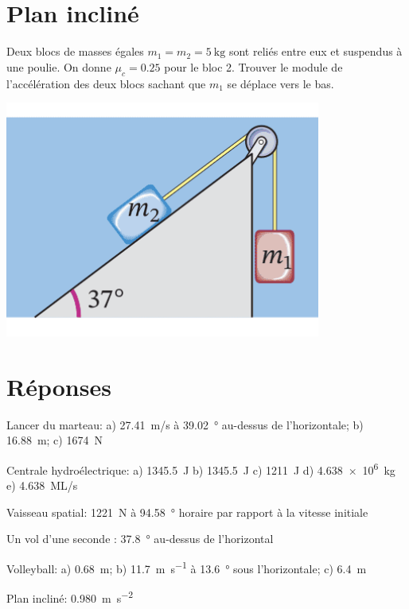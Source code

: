 \documentclass[nofonts]{tufte-handout}
\begin{document}
\section{Plan incliné}
Deux blocs de masses égales $m_1 = m_2 = \qty{5}{\kilo\gram}$ sont reliés entre
eux et suspendus à une poulie. On donne $\mu_c = \num{0.25}$ pour le bloc 2.
Trouver le module de l'accélération des deux blocs sachant que $m_1$ se déplace
vers le bas.
\begin{marginfigure}
  \includegraphics[width=\marginparwidth]{figures/benson_c6e21.png}
\end{marginfigure}


\section{Réponses}

\noindent Lancer du marteau: a) \qty{27.41}{m/s} à \qty{39.02}{\degree}
au-dessus de l'horizontale; b) \qty{16.88}{m}; c) \qty{1674}{N}

\noindent Centrale hydroélectrique: a) \qty{1345.5}{J}
    b) \qty{1345.5}{J}
    c) \qty{1211}{J}
    d) \qty{4.638e6}{kg}
    e) \qty{4.638}{ML/s}

\noindent Vaisseau spatial: \qty{1221}{N} à \qty{94.58}{\degree} horaire par
rapport à la vitesse initiale

\noindent Un vol d'une seconde : \qty{37.8}{\degree} au-dessus de l'horizontal

\noindent Volleyball: a) \qty{0.68}{\meter};
            b) \qty{11.7}{\meter\per\second} à \qty{13.6}{\degree} sous l'horizontale;
            c) \qty{6.4}{\meter}

\noindent Plan incliné: \qty{0.980}{\meter\per\second\squared}



\end{document}
